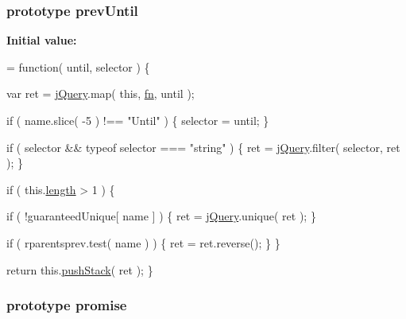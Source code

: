\hypertarget{jquery-1_810_82-vsdoc_8js_a261c6b8aae4b0d984ef1bb06c1caa7d1}{
\subsubsection[{prev\-Until}]{ {\bf prototype} prev\-Until}}\label{jquery-1_810_82-vsdoc_8js_a261c6b8aae4b0d984ef1bb06c1caa7d1}
{\bfseries Initial value\-:}
\begin{DoxyCode}
= \textcolor{keyword}{function}( until, selector ) \{


        var ret = \hyperlink{jquery-1_810_82-vsdoc_8js_add5237586d970a38a81f990e8eb28c6c}{jQuery}.map( \textcolor{keyword}{this}, \hyperlink{jquery-1_810_82-vsdoc_8js_acef6bdaf6b9b20fdcca1ea86f0902c3b}{fn}, until );

        \textcolor{keywordflow}{if} ( name.slice( -5 ) !== \textcolor{stringliteral}{"Until"} ) \{
            selector = until;
        \}

        \textcolor{keywordflow}{if} ( selector && typeof selector === \textcolor{stringliteral}{"string"} ) \{
            ret = \hyperlink{jquery-1_810_82-vsdoc_8js_add5237586d970a38a81f990e8eb28c6c}{jQuery}.filter( selector, ret );
        \}

        \textcolor{keywordflow}{if} ( this.\hyperlink{jquery-1_810_82-vsdoc_8js_aa7de35d58da66d9944ab9cbe82c19640}{length} > 1 ) \{
            
            \textcolor{keywordflow}{if} ( !guaranteedUnique[ name ] ) \{
                ret = \hyperlink{jquery-1_810_82-vsdoc_8js_add5237586d970a38a81f990e8eb28c6c}{jQuery}.unique( ret );
            \}

            
            \textcolor{keywordflow}{if} ( rparentsprev.test( name ) ) \{
                ret = ret.reverse();
            \}
        \}

        \textcolor{keywordflow}{return} this.\hyperlink{jquery-1_810_82-vsdoc_8js_afc3a7db1ef2b526338c06c07cecccd44}{pushStack}( ret );
    \}
\end{DoxyCode}
\hypertarget{jquery-1_810_82-vsdoc_8js_a06426ace6e929cd19d94010b6c27109d}{
\subsubsection[{promise}]{ {\bf prototype} promise}}\label{jquery-1_810_82-vsdoc_8js_a06426ace6e929cd19d94010b6c27109d}
